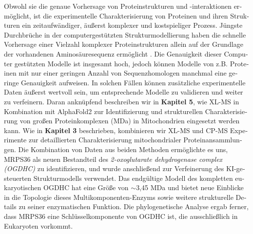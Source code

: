 \begin{otherlanguage}{german}
    Obwohl sie die genaue Vorhersage von Proteinstrukturen und -interaktionen ermöglicht, ist die experimentelle Charakterisierung von Proteinen und ihren Strukturen ein zeit\-aufwändiger, äußerst komplexer und kostspieliger Prozess. Jüngste Durchbrüche in der computergestützten Strukturmodellierung haben die schnelle Vorhersage einer Vielzahl komplexer Proteinstrukturen allein auf der Grundlage der vorhandenen Amino\-säuresequenz ermöglicht \cite{RN5, RN4}. Die Genauigkeit dieser Computer gestützten Modelle ist insgesamt hoch, jedoch können Modelle von z.B. Proteinen mit nur einer geringen Anzahl von Sequenzhomologen manchmal eine geringe Genauigkeit aufweisen. In solchen Fällen können zusätzliche experimentelle Daten äußerst wertvoll sein, um entsprechende Modelle zu validieren und weiter zu verfeinern. Daran anknüpfend beschreiben wir in \textbf{Kapitel 5}, wie XL-MS in Kombination mit AlphaFold2 \cite{RN4} zur Identifizierung und strukturellen Charakterisierung von großen Proteinkomplexen (MDa) in Mitochondrien eingesetzt werden kann. Wie in \textbf{Kapitel 3} beschrieben, kombinieren wir XL-MS und CP-MS Experimente zur detaillierten Charakterisierung mitochondrialer Proteinansammlungen. Die Kombination von Daten aus beiden Methoden ermöglichte es uns, MRPS36 als neuen Bestandteil des \emph{2-oxoglutarate dehydrogenase complex (OGDHC)} zu identifizieren, und wurde anschließend zur Verfeinerung des KI-gesteuerten Strukturmodells verwendet. Das endgültige Modell des kompletten eukaryotischen OGDHC hat eine Größe von $\sim$3,45 MDa und bietet neue Einblicke in die Topologie dieses Multikomponenten-Enzyms sowie weitere strukturelle Details zu seiner enzymatischen Funktion. Die phylogenetische Analyse ergab ferner, dass MRPS36 eine Schlüsselkomponente von OGDHC ist, die ausschließlich in Eukaryoten vorkommt.
\end{otherlanguage}
